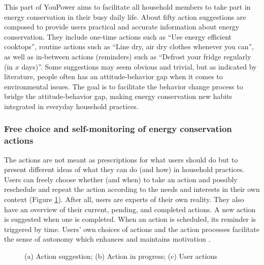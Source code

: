 This part of YouPower aims to %
facilitate all household members to take part in energy conservation in their busy daily life. 
% 
About fifty action suggestions are composed to provide users practical and accurate information about energy conservation. 
They include one-time actions such as ``Use energy efficient cooktops'', routine actions such as ``Line dry, air dry clothes whenever you can'', as well as in-between actions (reminders) such as ``Defrost your fridge regularly (in $x$ days)''. 
Some suggestions may seem obvious and trivial, but as indicated by literature, people often has an attitude-behavior gap when it comes to environmental issues. The goal is to facilitate the behavior change process to bridge the attitude-behavior gap, making energy conservation new habits integrated in everyday household practices. 

\subsubsection{Free choice and self-monitoring of energy conservation actions}
The actions are not meant as prescriptions for what users should do but to present different ideas of what they can do (and how) in household practices. 
Users can freely choose whether (and when) to take an action and possibly reschedule and repeat the action according to the needs and interests in their own context (Figure \ref{fig:actions}). After all, users are experts of their own reality. They also have an overview of their current, pending, and completed actions.
A new action is suggested when one is completed. %
When an action is scheduled, its reminder is triggered by time. Users' own choices of actions and the action processes facilitate the sense of autonomy which enhances and maintains motivation \cite{Ryan2000}. 

\begin{figure}[b!]
      \begin{center}
        \begin{minipage}[t!]{0.33\linewidth}
        \end{minipage}
        \begin{minipage}[t!]{0.31\linewidth}
                \end{minipage}
        \begin{minipage}[t!]{0.33\linewidth}    
        \end{minipage}
      \end{center}
      \caption{(a) Action suggestion; (b) Action in progress; (c) User actions}\label{fig:actions}
\end{figure}


